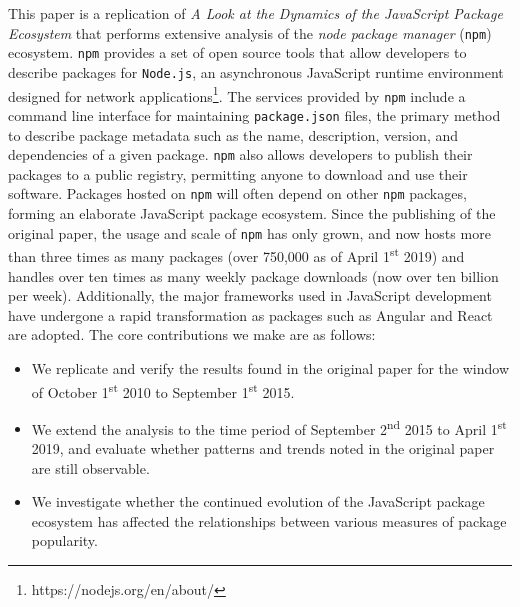 \documentclass[10pt,conference]{IEEEtran}
\def\code#1{\texttt{#1}}
\begin{document}
This paper is a replication of \emph{A Look at the Dynamics of the JavaScript Package Ecosystem}\cite{Wittern:2016} 
that performs extensive analysis of the \emph{node package manager} (\code{npm}) ecosystem. 
\code{npm} provides a set of open source tools that allow developers to 
describe packages for \code{Node.js}, an asynchronous JavaScript runtime environment 
designed for network applications\footnote{https://nodejs.org/en/about/}.
The services provided by \code{npm} include a command line interface for maintaining 
\code{package.json} files, the primary method to describe package metadata such as the name,
description, version, and dependencies of a given package. \code{npm} also allows 
developers to publish their packages to a public registry, permitting anyone 
to download and use their software. Packages hosted on \code{npm} will often depend on other \code{npm}
packages, forming an elaborate JavaScript package ecosystem.
Since the publishing of the original paper, the usage and scale of \code{npm} has only grown,
and now hosts more than three times as many packages (over 750,000 as of April 1\textsuperscript{st} 2019) 
and handles over ten times as many weekly package downloads (now over ten billion per week).
Additionally, the major frameworks used in JavaScript development have undergone a 
rapid transformation as packages such as Angular and React are adopted\footnotemark[\ref{adoption}].
The core contributions we make are as follows:
\begin{itemize}
  \item We replicate and verify the results found in the original paper for the 
    window of October 1\textsuperscript{st} 2010 to September 1\textsuperscript{st} 2015.
  \item We extend the analysis to the time period of September 2\textsuperscript{nd} 
    2015 to April 1\textsuperscript{st} 2019, and evaluate whether patterns and trends 
    noted in the original paper are still observable.
  \item We investigate whether the continued evolution of the JavaScript package 
    ecosystem has affected the relationships between various measures of package popularity.
\end{itemize}
\end{document}
